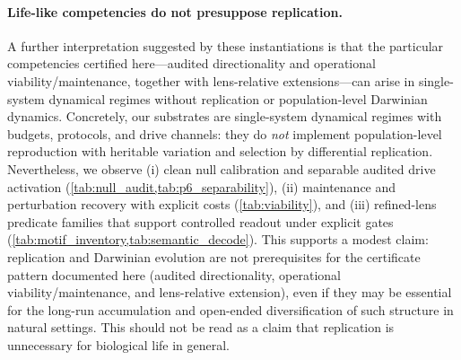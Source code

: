 \documentclass[11pt]{article}
\begin{document}
\paragraph{Life-like competencies do not presuppose replication.}
A further interpretation suggested by these instantiations is that the particular competencies certified here---audited directionality and operational viability/maintenance, together with lens-relative extensions---can arise in single-system dynamical regimes without replication or population-level Darwinian dynamics. Concretely, our substrates are single-system dynamical regimes with budgets, protocols, and drive channels: they do \emph{not} implement population-level reproduction with heritable variation and selection by differential replication. Nevertheless, we observe (i) clean null calibration and separable audited drive activation (\cref{tab:null_audit,tab:p6_separability}), (ii) maintenance and perturbation recovery with explicit costs (\cref{tab:viability}), and (iii) refined-lens predicate families that support controlled readout under explicit gates (\cref{tab:motif_inventory,tab:semantic_decode}). This supports a modest claim: replication and Darwinian evolution are not prerequisites for the certificate pattern documented here (audited directionality, operational viability/maintenance, and lens-relative extension), even if they may be essential for the long-run accumulation and open-ended diversification of such structure in natural settings. This should not be read as a claim that replication is unnecessary for biological life in general.
\end{document}
